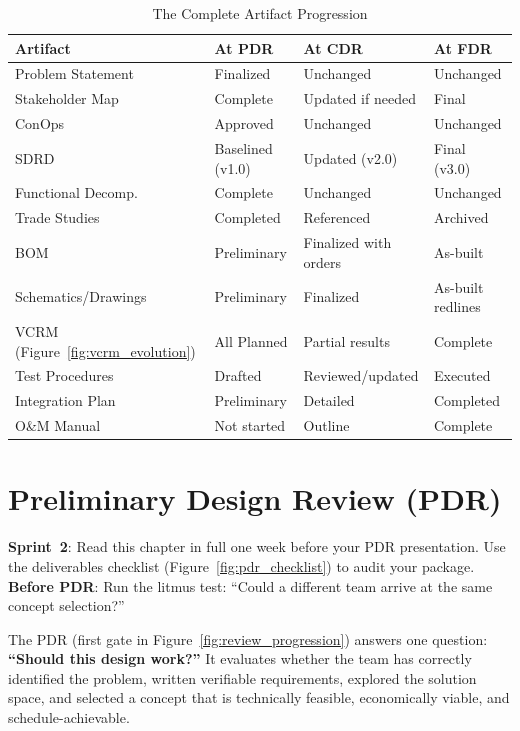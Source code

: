 \documentclass[11pt,letterpaper,twoside,openany]{book}
\begin{document}
\begin{table}[htbp]\centering\small
\caption{The Complete Artifact Progression}
\begin{tabularx}{\textwidth}{l X X X}
\toprule
\textbf{Artifact} & \textbf{At PDR} & \textbf{At CDR} & \textbf{At FDR} \\
\midrule
Problem Statement & Finalized & Unchanged & Unchanged \\
Stakeholder Map & Complete & Updated if needed & Final \\
ConOps & Approved & Unchanged & Unchanged \\
SDRD & Baselined (v1.0) & Updated (v2.0) & Final (v3.0) \\
Functional Decomp.\ & Complete & Unchanged & Unchanged \\
Trade Studies & Completed & Referenced & Archived \\
BOM & Preliminary & Finalized with orders & As-built \\
Schematics/Drawings & Preliminary & Finalized & As-built redlines \\
VCRM (Figure~\ref{fig:vcrm_evolution}) & All Planned & Partial results & Complete \\
Test Procedures & Drafted & Reviewed/updated & Executed \\
Integration Plan & Preliminary & Detailed & Completed \\
O\&M Manual & Not started & Outline & Complete \\
\bottomrule
\end{tabularx}
\end{table}


\chapter{Preliminary Design Review (PDR)}\label{ch:pdr}

\begin{tipbox}
\textbf{Sprint~2}: Read this chapter in full one week before your PDR presentation. Use the deliverables checklist (Figure~\ref{fig:pdr_checklist}) to audit your package. \textbf{Before PDR}: Run the litmus test: ``Could a different team arrive at the same concept selection?''
\end{tipbox}


\vspace{1em}

The PDR (first gate in Figure~\ref{fig:review_progression}) answers one question: \textbf{``Should this design work?''} It evaluates whether the team has correctly identified the problem, written verifiable requirements, explored the solution space, and selected a concept that is technically feasible, economically viable, and schedule-achievable.
\end{document}

